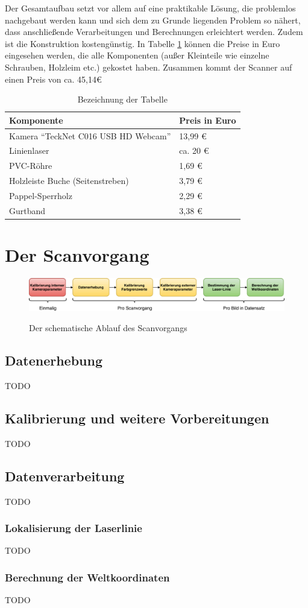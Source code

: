 Der Gesamtaufbau setzt vor allem auf eine praktikable Lösung, die problemlos nachgebaut werden kann und sich dem zu Grunde liegenden Problem so nähert, dass anschließende Verarbeitungen und Berechnungen erleichtert werden. Zudem ist die Konstruktion kostengünstig. In Tabelle \ref{tab:preise} können die Preise in Euro eingesehen werden, die alle Komponenten (außer Kleinteile wie einzelne Schrauben, Holzleim etc.) gekostet haben. Zusammen kommt der Scanner auf einen Preis von ca. 45,14\euro

\begin{table} %
	\centering
		\begin{tabular}{l | l}
		\textbf{Komponente} & \textbf{Preis in Euro}\\
		\hline
			Kamera "`TeckNet C016 USB HD Webcam"' & 13,99 \euro\\
			Linienlaser &  ca. 20 \euro\\
			PVC-Röhre & 1,69 \euro\\
			Holzleiste Buche (Seitenstreben) & 3,79 \euro\\
			Pappel-Sperrholz &  2,29 \euro\\
			Gurtband & 3,38 \euro
		\end{tabular}
	\caption{Bezeichnung der Tabelle}
	\label{tab:preise}
\end{table}


\section{Der Scanvorgang}
\begin{figure}
\centering \includegraphics[width=1.0\textwidth]{images/ScannerVerfahren.pdf}\label{fig:scanVorgang}
\caption{Der schematische Ablauf des Scanvorgangs}
\end{figure}

\subsection{Datenerhebung}
TODO

\subsection{Kalibrierung und weitere Vorbereitungen}
TODO

\subsection{Datenverarbeitung}
TODO

\subsubsection{Lokalisierung der Laserlinie}
TODO

\subsubsection{Berechnung der Weltkoordinaten}
TODO

